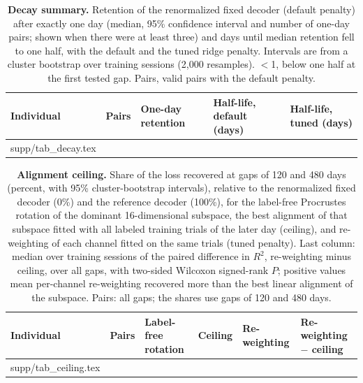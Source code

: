 \documentclass[pdflatex,sn-nature]{sn-jnl}
\makeatletter
\newcommand\tabinput[1]{\@@input #1 }
\makeatother
\begin{document}
\begin{table}[p]
\caption{\textbf{Decay summary.} Retention of the renormalized fixed decoder (default penalty) after exactly one day (median, 95\%
confidence interval and number of one-day pairs; shown when there were at least three) and days until median retention
fell to one half, with the default and the tuned ridge penalty. Intervals are from a cluster bootstrap over training
sessions (2,000 resamples). $<$1, below one half at the first tested gap. Pairs, valid pairs with the default penalty.}
\label{tab:decay}
\footnotesize
\begin{tabular}{@{}lrlll@{}}
\toprule
Individual & Pairs & One-day retention & Half-life, default (days) & Half-life, tuned (days) \\
\midrule
\tabinput{supp/tab_decay.tex}
\botrule
\end{tabular}
\end{table}

\begin{table}[p]
\caption{\textbf{Alignment ceiling.} Share of the loss recovered at gaps of 120 and 480 days (percent, with 95\%
cluster-bootstrap intervals), relative to the renormalized fixed decoder (0\%) and the reference decoder (100\%), for the
label-free Procrustes rotation of the dominant 16-dimensional subspace, the best alignment of that subspace fitted with
all labeled training trials of the later day (ceiling), and re-weighting of each channel fitted on the same trials
(tuned penalty). Last column: median over training sessions of the paired difference in $R^2$, re-weighting minus
ceiling, over all gaps, with two-sided Wilcoxon signed-rank $P$; positive values mean per-channel re-weighting
recovered more than the best linear alignment of the subspace. Pairs: all gaps; the shares use gaps of 120 and 480
days.}
\label{tab:ceiling}
\footnotesize
\begin{tabular}{@{}lrllll@{}}
\toprule
Individual & Pairs & Label-free rotation & Ceiling & Re-weighting & Re-weighting $-$ ceiling \\
\midrule
\tabinput{supp/tab_ceiling.tex}
\botrule
\end{tabular}
\end{table}
\end{document}
